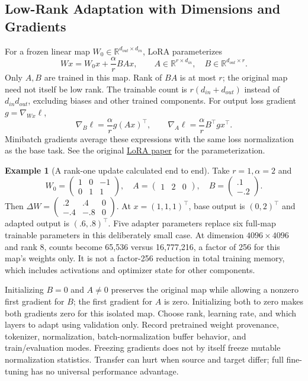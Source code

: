\documentclass[11pt,twoside]{article}
\numberwithin{equation}{section}
\newcommand{\R}{\mathbb{R}}
\theoremstyle{plain}
\theoremstyle{definition}
\newtheorem{example}[theorem]{Example}
\theoremstyle{remark}
\begin{document}
\subsection{Low-Rank Adaptation with Dimensions and Gradients}
\label{sec:lora-worked}
For a frozen linear map $W_0\in\R^{d_{out}\times d_{in}}$, LoRA parameterizes
\[
Wx=W_0x+\frac\alpha r BAx,\qquad
A\in\R^{r\times d_{in}},\quad B\in\R^{d_{out}\times r}.
\]
Only $A,B$ are trained in this map. Rank of $BA$ is at most $r$; the original
map need not itself be low rank. The trainable count is $r(d_{in}+d_{out})$
instead of $d_{in}d_{out}$, excluding biases and other trained components.
For output loss gradient $g=\nabla_{Wx}\ell$,
\[
\nabla_B\ell=\frac\alpha r g(Ax)^\top,\qquad
\nabla_A\ell=\frac\alpha r B^\top g x^\top.
\]
Minibatch gradients average these expressions with the same loss normalization
as the base task. See the original
\href{https://arxiv.org/abs/2106.09685}{LoRA paper} for the parameterization.

\begin{example}[A rank-one update calculated end to end]
Take $r=1,\alpha=2$ and
\[
W_0=\begin{pmatrix}1&0&-1\\0&1&1\end{pmatrix},\quad
A=\begin{pmatrix}1&2&0\end{pmatrix},\quad
B=\begin{pmatrix}.1\\-.2\end{pmatrix}.
\]
Then $\Delta W=\begin{pmatrix}.2&.4&0\\-.4&-.8&0\end{pmatrix}$.
At $x=(1,1,1)^\top$, base output is $(0,2)^\top$ and adapted output is
$(.6,.8)^\top$. Five adapter parameters replace six full-map trainable
parameters in this deliberately small case. At dimension $4096\times4096$
and rank 8, counts become 65,536 versus 16,777,216, a factor of 256 for this
map's weights only. It is not a factor-256 reduction in total training memory,
which includes activations and optimizer state for other components.

Initializing $B=0$ and $A\ne0$ preserves the original map while allowing a
nonzero first gradient for $B$; the first gradient for $A$ is zero.
Initializing both to zero makes both gradients zero for this isolated map.
Choose rank, learning rate, and which layers to adapt using validation only.
Record pretrained weight provenance, tokenizer, normalization, batch-normalization
buffer behavior, and train/evaluation modes. Freezing gradients does not by
itself freeze mutable normalization statistics. Transfer can hurt when source
and target differ; full fine-tuning has no universal performance advantage.
\end{example}
\end{document}
